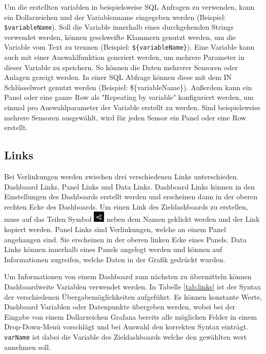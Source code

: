 \documentclass[a4paper, 12pt, oneside]{scrbook}
\begin{document}
	 	\noindent Um die erstellten variablen in beispielsweise SQL Anfragen zu verwenden, kann ein Dollarzeichen und der Variablenname eingegeben werden (Beispiel: \texttt{\$variableName})\cite{GrafanaLabs:Variables}. Soll die Variable innerhalb eines durchgehenden Strings verwendet werden, können geschweifte Klammern genutzt werden, um die Variable vom Text zu trennen (Beispiel: \texttt{\$\{variableName\}})\cite{GrafanaLabs:Variables}. Eine Variable kann auch mit einer Auswahlfunktion generiert werden, um mehrere Parameter in dieser Variable zu speichern. So können die Daten mehrerer Sensoren oder Anlagen gezeigt werden. In einer SQL Abfrage können diese mit dem IN Schlüsselwort genutzt werden (Beispiel: \$\{variableName\})\cite{GrafanaLabs:Variables}. Außerdem kann ein Panel oder eine ganze Row als "Repeating by variable" konfiguriert werden, um einmal pro Auswahlparameter der Variable erstellt zu werden. Sind beispielsweise mehrere Sensoren ausgewählt, wird für jeden Sensor ein Panel oder eine Row erstellt.
	  	
		\subsection{Links}
		 
		\noindent Bei Verlinkungen werden zwischen drei verschiedenen Links unterschieden. Dashboard Links, Panel Links und Data Links. Dashboard Links können in den Einstellungen des Dashboards erstellt werden und erscheinen dann in der oberen rechten Ecke des Dashboards. Um einen Link des Zieldashboards zu erstellen, muss auf das Teilen Symbol \includegraphics{res/teilensymbol.png} neben dem Namen geklickt werden und der Link kopiert werden. Panel Links sind Verlinkungen, welche an einem Panel angehangen sind. Sie erscheinen in der oberen linken Ecke eines Panels. Data Links können innerhalb eines Panels angelegt werden und können auf Informationen zugreifen, welche Daten in der Grafik gedrückt wurden. 
		
		\noindent Um Informationen von einem Dashboard zum nächsten zu übermitteln können Dashboardweite Variablen verwendet werden. In Tabelle \ref{tab:links} ist der Syntax der verschiedenen Übergabemöglichkeiten aufgeführt. Es können konstante Werte, Dashboard Variablen oder Datenpunkte übergeben werden, wobei bei der Eingabe von einem Dollarzeichen Grafana bereits alle möglichen Felder in einem Drop-Down-Menü vorschlägt und bei Auswahl den korrekten Syntax einträgt. \texttt{varName} ist dabei die Variable des Zieldashboards welche den gewählten wert annehmen soll.
			 
\end{document}
